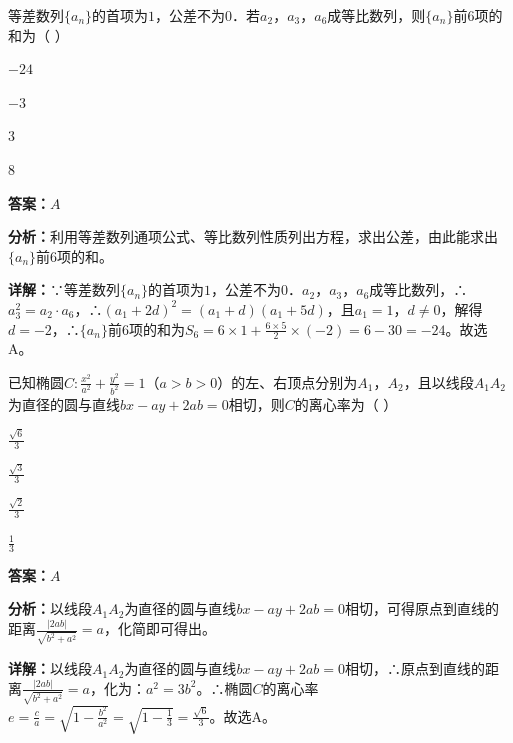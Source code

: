 \begin{question}[points=5]
等差数列$\{a_n\}$的首项为$1$，公差不为$0$．若$a_2$，$a_3$，$a_6$成等比数列，则$\{a_n\}$前$6$项的和为（ ）
\begin{choices}
  \item $-24$
  \item $-3$
  \item $3$
  \item $8$
\end{choices}
\begin{solution}
\textbf{答案：}$A$

\textbf{分析：}利用等差数列通项公式、等比数列性质列出方程，求出公差，由此能求出$\{a_n\}$前6项的和。

\textbf{详解：}∵等差数列$\{a_n\}$的首项为$1$，公差不为$0$．$a_2$，$a_3$，$a_6$成等比数列，∴$a_3^2=a_2\cdot a_6$，∴$(a_1+2d)^2=(a_1+d)(a_1+5d)$，且$a_1=1$，$d\neq0$，解得$d=-2$，∴$\{a_n\}$前$6$项的和为$S_6=6\times1+\frac{6\times5}{2}\times(-2)=6-30=-24$。故选A。
\end{solution}
\end{question}

\begin{question}[points=5]
已知椭圆$C:\frac{x^2}{a^2}+\frac{y^2}{b^2}=1$（$a>b>0$）的左、右顶点分别为$A_1$，$A_2$，且以线段$A_1A_2$为直径的圆与直线$bx-ay+2ab=0$相切，则$C$的离心率为（ ）
\begin{choices}
  \item $\frac{\sqrt{6}}{3}$
  \item $\frac{\sqrt{3}}{3}$
  \item $\frac{\sqrt{2}}{3}$
  \item $\frac{1}{3}$
\end{choices}
\begin{solution}
\textbf{答案：}$A$

\textbf{分析：}以线段$A_1A_2$为直径的圆与直线$bx-ay+2ab=0$相切，可得原点到直线的距离$\frac{|2ab|}{\sqrt{b^2+a^2}}=a$，化简即可得出。

\textbf{详解：}以线段$A_1A_2$为直径的圆与直线$bx-ay+2ab=0$相切，∴原点到直线的距离$\frac{|2ab|}{\sqrt{b^2+a^2}}=a$，化为：$a^2=3b^2$。∴椭圆$C$的离心率$e=\frac{c}{a}=\sqrt{1-\frac{b^2}{a^2}}=\sqrt{1-\frac{1}{3}}=\frac{\sqrt{6}}{3}$。故选A。
\end{solution}
\end{question}

